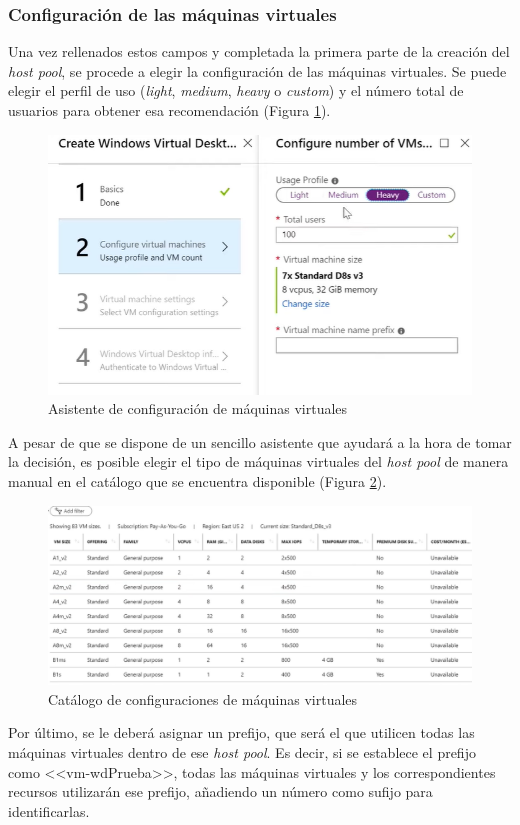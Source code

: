\subsubsection{Configuración de las máquinas virtuales}
Una vez rellenados estos campos y completada la primera parte de la creación del \textit{host pool}, se procede a elegir la configuración de las máquinas virtuales. Se puede elegir el perfil de uso (\textit{light}, \textit{medium}, \textit{heavy} o \textit{custom}) y el número total de usuarios para obtener esa recomendación (Figura \ref{fig:asistente_mv}).

\begin{figure}[h]
  \centering
  \includegraphics[width=0.6\linewidth]{figures/images/asistente_mv.PNG}
  \caption{Asistente de configuración de máquinas virtuales}
  \label{fig:asistente_mv}
\end{figure}

A pesar de que se dispone de un sencillo asistente que ayudará a la hora de tomar la decisión, es posible elegir el tipo de máquinas virtuales del \textit{host pool} de manera manual en el catálogo que se encuentra disponible (Figura \ref{fig:tipos_mv}).

\begin{figure}[h]
  \centering
  \includegraphics[width=0.8\linewidth]{figures/images/tipos_mv.PNG}
  \caption{Catálogo de configuraciones de máquinas virtuales}
  \label{fig:tipos_mv}
\end{figure}

Por último, se le deberá asignar un prefijo, que será el que utilicen todas las máquinas virtuales dentro de ese \textit{host pool}. Es decir, si se establece el prefijo como <<vm-wdPrueba>>, todas las máquinas virtuales y los correspondientes recursos utilizarán ese prefijo, añadiendo un número como sufijo para identificarlas.


